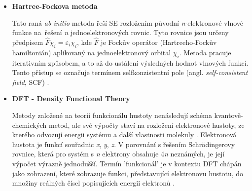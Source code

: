 \begin{itemize}
    \item \textbf{Hartree-Fockova metoda}
    
    Tato raná \textit{ab initio} metoda řeší SE rozložením původní \textit{n}-elektronové vlnové fun\-kce na~řešení \textit{n} jednoelektronových rovnic. Tyto rovnice jsou určeny předpisem $\hat{F} \chi_i = \varepsilon_i \chi_i$, kde $\hat{F}$ je Fockův operátor (Hartreeho-Fockův hamiltonián) aplikovaný na jednoelektronový orbital $\chi_i$. Metoda pracuje iterativním způsobem, a to až do ustálení výsledných hodnot vlnových funkcí. Tento přístup se označuje termínem selfkonzistentní pole (angl. \textit{self-consistent field}, SCF) \cite{Levine}. 

    \item \textbf{DFT - Density Functional Theory}
    
    Metody založené na teorii funkcionálu hustoty  nenásledují schéma kvan\-tově-chemických metod, ale své výpočty staví na rozložení elektronové hustoty, ze kterého odvozují energii systému a další vlastnosti molekuly \cite{dft_nmr}. Elektronová hustota je funkcí souřadnic \textit{x}, \textit{y}, \textit{z}. V porovnání s řešením Schrödingerovy rovnice, která pro systém s \textit{n} elektrony obsahuje 4\textit{n} neznámých, je její výpočet výrazně jednodušší. Termín 'funkcionál' je v kontextu DFT chápán jako zobrazení, které zobrazuje funkci, představující elektronovu hustotu, do množiny reálných čísel popisujících energii elektronů \cite{dft}.


\end{itemize}
